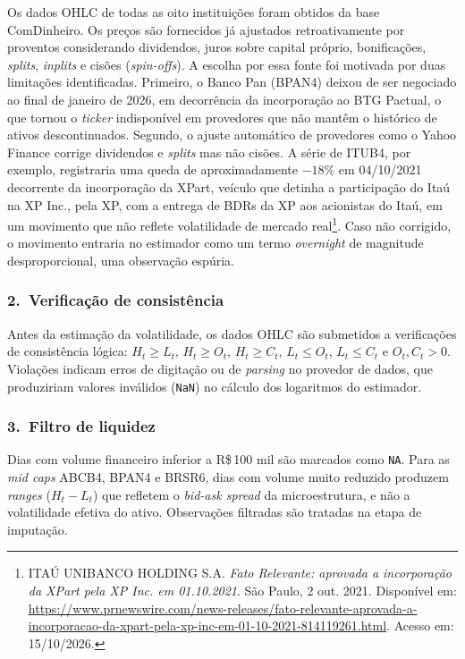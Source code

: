 \documentclass[12pt, a4paper, oneside, english, brazil]{abntex2}
\begin{document}
Os dados OHLC de todas as oito instituições foram obtidos da base ComDinheiro.
Os preços são fornecidos já ajustados retroativamente por proventos considerando dividendos, 
juros sobre capital próprio, bonificações, \textit{splits}, \textit{inplits} e cisões 
(\textit{spin-offs}). A escolha por essa fonte foi motivada por duas limitações identificadas.
Primeiro, o Banco Pan (BPAN4) deixou de ser negociado ao final de janeiro de 2026, 
em decorrência da incorporação ao BTG Pactual, o que tornou o \textit{ticker} indisponível 
em provedores que não mantêm o histórico de ativos descontinuados. Segundo, o ajuste automático
de provedores como o Yahoo Finance corrige dividendos e \textit{splits} mas não cisões. A série
de ITUB4, por exemplo, registraria uma queda de aproximadamente $-18\%$ em 04/10/2021 
decorrente da incorporação da XPart, veículo que
detinha a participação do Itaú na XP Inc., pela XP, com a entrega de BDRs da
XP aos acionistas do Itaú, em um movimento que não reflete volatilidade
de mercado real\footnote{ITAÚ UNIBANCO HOLDING S.A. \textit{Fato Relevante:
aprovada a incorporação da XPart pela XP Inc. em 01.10.2021}. São Paulo, 2
out. 2021. Disponível em:
\url{https://www.prnewswire.com/news-releases/fato-relevante-aprovada-a-incorporacao-da-xpart-pela-xp-inc-em-01-10-2021-814119261.html}.
Acesso em: 15/10/2026.}. Caso não corrigido, o movimento entraria no estimador como um termo
\textit{overnight} de magnitude desproporcional, uma observação espúria.

\subsubsection*{2.\ Verificação de consistência}

Antes da estimação da volatilidade, os dados OHLC são submetidos a verificações de
consistência lógica: $H_t \geq L_t$, $H_t \geq O_t$, $H_t \geq C_t$, $L_t \leq O_t$,
$L_t \leq C_t$ e $O_t, C_t > 0$. Violações indicam erros de digitação ou de
\textit{parsing} no provedor de dados, que produziriam valores inválidos (\texttt{NaN}) no cálculo dos
logaritmos do estimador.

\subsubsection*{3.\ Filtro de liquidez}

Dias com volume financeiro inferior a
R\$\,100 mil são marcados como \texttt{NA}. Para as \textit{mid caps} ABCB4, BPAN4 e
BRSR6, dias com volume muito reduzido produzem \textit{ranges} ($H_t - L_t$) que refletem
o \textit{bid-ask spread} da microestrutura, e não a volatilidade efetiva do ativo.
Observações filtradas são tratadas na etapa de imputação.
\end{document}
